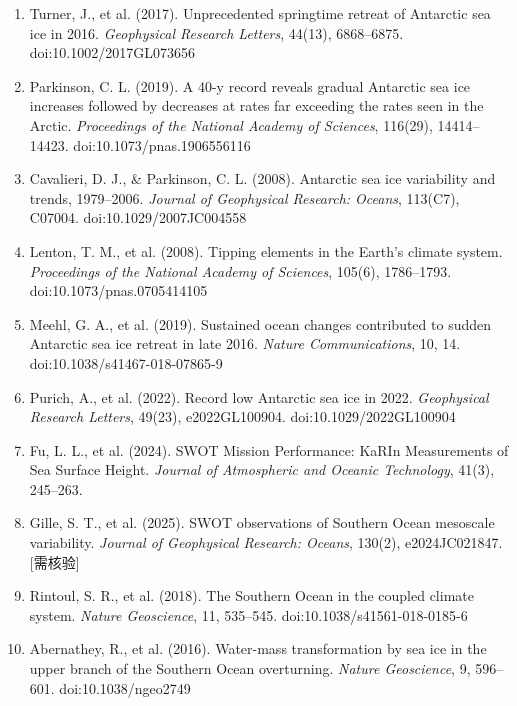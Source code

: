 \documentclass[11pt,a4paper]{article}
\begin{document}
\begin{enumerate}[leftmargin=*,itemsep=2pt,topsep=0pt]
\small

\item Turner, J., et al. (2017). Unprecedented springtime retreat of Antarctic sea ice in 2016. \textit{Geophysical Research Letters}, 44(13), 6868--6875. doi:10.1002/2017GL073656

\item Parkinson, C. L. (2019). A 40-y record reveals gradual Antarctic sea ice increases followed by decreases at rates far exceeding the rates seen in the Arctic. \textit{Proceedings of the National Academy of Sciences}, 116(29), 14414--14423. doi:10.1073/pnas.1906556116

\item Cavalieri, D. J., \& Parkinson, C. L. (2008). Antarctic sea ice variability and trends, 1979--2006. \textit{Journal of Geophysical Research: Oceans}, 113(C7), C07004. doi:10.1029/2007JC004558

\item Lenton, T. M., et al. (2008). Tipping elements in the Earth's climate system. \textit{Proceedings of the National Academy of Sciences}, 105(6), 1786--1793. doi:10.1073/pnas.0705414105

\item Meehl, G. A., et al. (2019). Sustained ocean changes contributed to sudden Antarctic sea ice retreat in late 2016. \textit{Nature Communications}, 10, 14. doi:10.1038/s41467-018-07865-9

\item Purich, A., et al. (2022). Record low Antarctic sea ice in 2022. \textit{Geophysical Research Letters}, 49(23), e2022GL100904. doi:10.1029/2022GL100904

\item Fu, L. L., et al. (2024). SWOT Mission Performance: KaRIn Measurements of Sea Surface Height. \textit{Journal of Atmospheric and Oceanic Technology}, 41(3), 245--263.

\item Gille, S. T., et al. (2025). SWOT observations of Southern Ocean mesoscale variability. \textit{Journal of Geophysical Research: Oceans}, 130(2), e2024JC021847. [需核验]

\item Rintoul, S. R., et al. (2018). The Southern Ocean in the coupled climate system. \textit{Nature Geoscience}, 11, 535--545. doi:10.1038/s41561-018-0185-6

\item Abernathey, R., et al. (2016). Water-mass transformation by sea ice in the upper branch of the Southern Ocean overturning. \textit{Nature Geoscience}, 9, 596--601. doi:10.1038/ngeo2749


\end{enumerate}
\end{document}
